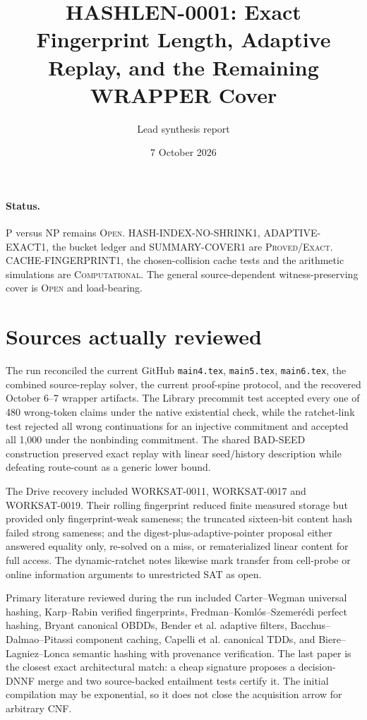 \documentclass[11pt]{article}
\title{HASHLEN-0001: Exact Fingerprint Length, Adaptive Replay, and the Remaining WRAPPER Cover}
\author{Lead synthesis report}
\date{7 October 2026}
\begin{document}
\maketitle

\paragraph{Status.}
P versus NP remains \textsc{Open}.  HASH-INDEX-NO-SHRINK1,
ADAPTIVE-EXACT1, the bucket ledger and SUMMARY-COVER1 are
\textsc{Proved/Exact}.  CACHE-FINGERPRINT1, the chosen-collision cache tests
and the arithmetic simulations are \textsc{Computational}.  The general
source-dependent witness-preserving cover is \textsc{Open} and load-bearing.

\section{Sources actually reviewed}
The run reconciled the current GitHub \texttt{main4.tex},
\texttt{main5.tex}, \texttt{main6.tex}, the combined source-replay solver,
the current proof-spine protocol, and the recovered October 6--7 wrapper
artifacts.  The Library precommit test accepted every one of 480 wrong-token
claims under the native existential check, while the ratchet-link test rejected
all wrong continuations for an injective commitment and accepted all 1,000
under the nonbinding commitment.  The shared BAD-SEED construction preserved
exact replay with linear seed/history description while defeating route-count
as a generic lower bound.

The Drive recovery included WORKSAT-0011, WORKSAT-0017 and WORKSAT-0019.
Their rolling fingerprint reduced finite measured storage but provided only
fingerprint-weak sameness; the truncated sixteen-bit content hash failed
strong sameness; and the digest-plus-adaptive-pointer proposal either answered
equality only, re-solved on a miss, or rematerialized linear content for full
access.  The dynamic-ratchet notes likewise mark transfer from cell-probe or
online information arguments to unrestricted SAT as open.

Primary literature reviewed during the run included Carter--Wegman universal
hashing, Karp--Rabin verified fingerprints, Fredman--Koml\'os--Szemer\'edi
perfect hashing, Bryant canonical OBDDs, Bender et al. adaptive filters,
Bacchus--Dalmao--Pitassi component caching, Capelli et al. canonical TDDs, and
Biere--Lagniez--Lonca semantic hashing with provenance verification.  The last
paper is the closest exact architectural match: a cheap signature proposes a
decision-DNNF merge and two source-backed entailment tests certify it.  The
initial compilation may be exponential, so it does not close the acquisition
arrow for arbitrary CNF.
\end{document}
